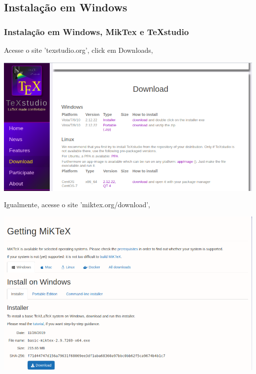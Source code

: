\documentclass{beamer}
\begin{document}
\begin{frame}

  \section{Instalação em Windows}

  \frametitle{Instalação em Windows, MikTex e TeXstudio}

  \begin{tcolorbox}[fontupper=\fontsize{3.7mm}{3.7mm}, size=small, sharp corners]
    Acesse o site 'texstudio.org', click em Downloads,
  \end{tcolorbox}

  \begin{center}
    \includegraphics[scale=0.16]{../Imagens/W1.png}
  \end{center}

  \pause

  \begin{tcolorbox}[fontupper=\fontsize{3.5mm}{3.5mm}, size=small, sharp corners]
    Igualmente, acesse o site 'miktex.org/download',
  \end{tcolorbox}

  \begin{center}
    \includegraphics[scale=0.16]{../Imagens/W2.png}
  \end{center}

\end{frame}
\end{document}
